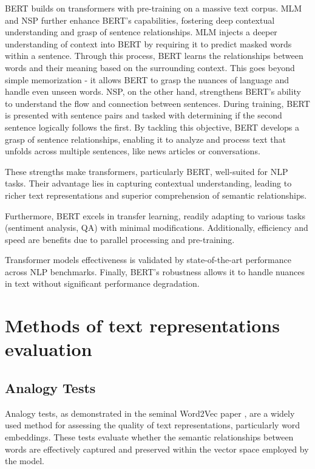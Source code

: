 \ac{BERT} \cite{devlin2019bert} builds on transformers with pre-training on a massive text corpus.
\ac{MLM} and \ac{NSP} further enhance \ac{BERT}'s capabilities, fostering deep contextual understanding and grasp of sentence relationships.
\ac{MLM} injects a deeper understanding of context into \ac{BERT} by requiring it to predict masked words within a sentence.
Through this process, \ac{BERT} learns the relationships between words and their meaning based on the surrounding context.
This goes beyond simple memorization - it allows \ac{BERT} to grasp the nuances of language and handle even unseen words.
\ac{NSP}, on the other hand, strengthens \ac{BERT}'s ability to understand the flow and connection between sentences.
During training, \ac{BERT} is presented with sentence pairs and tasked with determining if the second sentence logically follows the first. 
By tackling this objective, \ac{BERT} develops a grasp of sentence relationships, enabling it to analyze and process text that unfolds across multiple sentences, like news articles or conversations.

These strengths make transformers, particularly \ac{BERT}, well-suited for \ac{NLP} tasks.
Their advantage lies in capturing contextual understanding, leading to richer text representations and superior comprehension of semantic relationships.

Furthermore, \ac{BERT} excels in transfer learning, readily adapting to various tasks (sentiment analysis, \ac{QA}) with minimal modifications.
Additionally, efficiency and speed are benefits due to parallel processing and pre-training.

Transformer models effectiveness is validated by state-of-the-art performance across \ac{NLP} benchmarks.
Finally, \ac{BERT}'s robustness allows it to handle nuances in text without significant performance degradation.

\section{Methods of text representations evaluation}

\subsection{Analogy Tests}

Analogy tests, as demonstrated in the seminal Word2Vec paper \cite{mikolov2013efficient}, are a widely used method for assessing the quality of text representations, particularly word embeddings.
These tests evaluate whether the semantic relationships between words are effectively captured and preserved within the vector space employed by the model.

